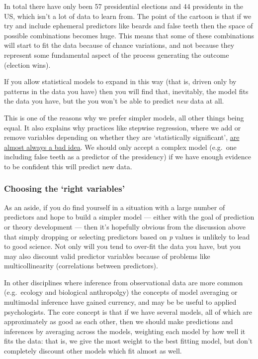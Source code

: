 \documentclass[]{article}
\theoremstyle{definition}
\theoremstyle{definition}
\theoremstyle{definition}
\theoremstyle{remark}
\begin{document}
In total there have only been 57 presidential elections and 44
presidents in the US, which isn't a lot of data to learn from. The point
of the cartoon is that if we try and include ephemeral predictors like
beards and false teeth then the space of possible combinations becomes
huge. This means that some of these combinations will start to fit the
data because of chance variations, and not because they represent some
fundamental aspect of the process generating the outcome (election
wins).

If you allow statistical models to expand in this way (that is, driven
only by patterns in the data you have) then you will find that,
inevitably, the model fits the data you have, but the you won't be able
to predict \emph{new} data at all.

This is one of the reasons why we prefer simpler models, all other
things being equal. It also explains why practices like stepwise
regression, where we add or remove variables depending on whether they
are `statistically significant',
\href{http://www.stata.com/support/faqs/statistics/stepwise-regression-problems/}{are
almost always a bad idea}. We should only accept a complex model
(e.g.~one including false teeth as a predictor of the presidency) if we
have enough evidence to be confident this will predict new data.

\subsubsection*{\texorpdfstring{Choosing the `right
variables'}{Choosing the right variables}}\label{variable-selection}

As an aside, if you do find yourself in a situation with a large number
of predictors and hope to build a simpler model --- either with the goal
of prediction or theory development --- then it's hopefully obvious from
the discussion above that simply dropping or selecting predictors based
on \emph{p} values is unlikely to lead to good science. Not only will
you tend to over-fit the data you have, but you may also discount valid
predictor variables because of problems like multicollinearity
(correlations between predictors).

In other disciplines where inference from observational data are more
common (e.g.~ecology and biological anthropolgy) the concepts of model
averaging or multimodal inference have gained currency, and may be be
useful to applied psychologists. The core concept is that if we have
several models, all of which are approximately as good as each other,
then we should make predictions and inferences by averaging across the
models, weighting each model by how well it fits the data: that is, we
give the most weight to the best fitting model, but don't completely
discount other models which fit almost as well.
\end{document}
